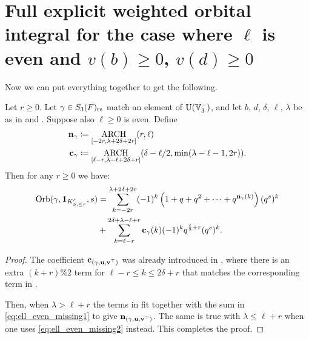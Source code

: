 \section{Full explicit weighted orbital integral for the case where $\ell$ is even and $v(b) \ge 0$, $v(d) \ge 0$}
Now we can put everything together to get the following.
\begin{theorem}
  \label{thm:full_orbital_ell_even}
  Let $r \ge 0$.
  Let $\gamma \in S_3(F)_{\mathrm{rs}}$ match an element of $\operatorname{U}(\mathbb V_3^-)$,
  and let $b$, $d$, $\delta$, $\ell$, $\lambda$ be as in
   and .
  Suppose also $\ell \ge 0$ is even.
  Define
  \begin{align*}
    \mathbf n_\gamma &\coloneqq \operatorname*{ARCH}_{[-2r, \lambda + 2\delta + 2r]}(r, \ell) \\
    \mathbf c_\gamma &\coloneqq \operatorname*{ARCH}_{[\ell-r, \lambda - \ell + 2\delta + r]}
    (\delta - \ell/2, \min(\lambda-\ell-1, 2r)).
  \end{align*}
  Then for any $r \ge 0$ we have:
  \begin{align*}
    \operatorname{Orb}(\gamma, \mathbf{1}_{K'_{S, \le r}}, s)
    &= \sum_{k = -2r}^{\lambda + 2\delta +  2r}
    (-1)^k \left( 1 + q + q^2 + \dots + q^{\mathbf n_{\gamma}(k)}  \right) (q^s)^k \\
    &+ \sum_{k = \ell-r}^{2\delta + \lambda - \ell + r} \mathbf c_\gamma(k) (-1)^k q^{\frac{\ell}{2}+r} (q^s)^k.
  \end{align*}
\end{theorem}
\begin{proof}
  The coefficient $\mathbf c_{(\gamma, \mathbf u, \mathbf v^\top)}$ was already introduced in ,
  where there is an extra $(k+r)\%2$ term for $\ell-r \le k \le 2\delta+r$
  that matches the corresponding term in .

  Then, when $\lambda > \ell + r$ the terms in 
  fit together with the sum in \eqref{eq:ell_even_missing1} to give $\mathbf n_{(\gamma, \mathbf u, \mathbf v^\top)}$.
  The same is true with $\lambda \le \ell + r$
  when one uses \eqref{eq:ell_even_missing2} instead.
  This completes the proof.
\end{proof}

